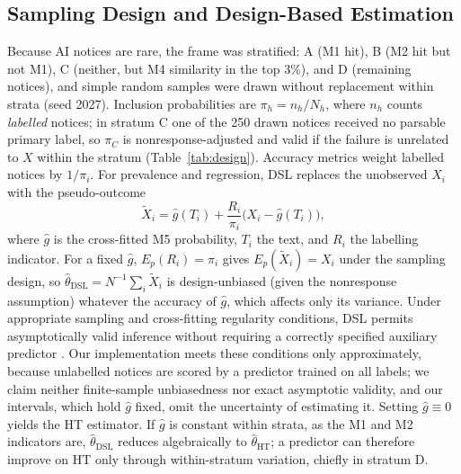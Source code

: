 \documentclass[runningheads]{llncs}
\begin{document}
\subsection{Sampling Design and Design-Based Estimation}
Because AI notices are rare, the frame was stratified: A (M1 hit), B (M2 hit but not M1), C (neither, but M4 similarity in the top 3\%), and D (remaining notices), and simple random samples were drawn without replacement within strata (seed 2027). Inclusion probabilities are $\pi_h=n_h/N_h$, where $n_h$ counts \emph{labelled} notices; in stratum C one of the 250 drawn notices received no parsable primary label, so $\pi_C$ is nonresponse-adjusted and valid if the failure is unrelated to $X$ within the stratum (Table~\ref{tab:design}). Accuracy metrics weight labelled notices by $1/\pi_i$. For prevalence and regression, DSL replaces the unobserved $X_i$ with the pseudo-outcome
\begin{equation}
\tilde{X}_i=\hat{g}(T_i)+\frac{R_i}{\pi_i}\bigl(X_i-\hat{g}(T_i)\bigr),
\label{eq:pseudo}
\end{equation}
where $\hat{g}$ is the cross-fitted M5 probability, $T_i$ the text, and $R_i$ the labelling indicator. For a fixed $\hat{g}$, $E_p(R_i)=\pi_i$ gives $E_p(\tilde{X}_i)=X_i$ under the sampling design, so $\hat\theta_{\mathrm{DSL}}=N^{-1}\sum_i\tilde{X}_i$ is design-unbiased (given the nonresponse assumption) whatever the accuracy of $\hat{g}$, which affects only its variance. Under appropriate sampling and cross-fitting regularity conditions, DSL permits asymptotically valid inference without requiring a correctly specified auxiliary predictor \cite{egami2023}. Our implementation meets these conditions only approximately, because unlabelled notices are scored by a predictor trained on all labels; we claim neither finite-sample unbiasedness nor exact asymptotic validity, and our intervals, which hold $\hat{g}$ fixed, omit the uncertainty of estimating it. Setting $\hat{g}\equiv0$ yields the HT estimator. If $\hat{g}$ is constant within strata, as the M1 and M2 indicators are, $\hat\theta_{\mathrm{DSL}}$ reduces algebraically to $\hat\theta_{\mathrm{HT}}$; a predictor can therefore improve on HT only through within-stratum variation, chiefly in stratum D.
\end{document}
